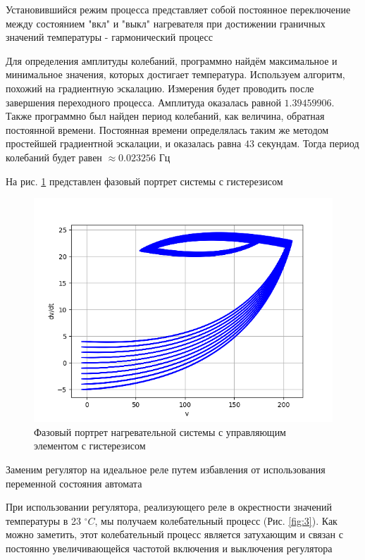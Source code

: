Установившийся режим процесса представляет собой постоянное переключение между состоянием "вкл" и "выкл" нагревателя
при достижении граничных значений температуры - гармонический процесс

Для определения амплитуды колебаний, программно найдём максимальное и минимальное значения,
которых достигает температура. Используем алгоритм, похожий на градиентную эскалацию. Измерения
будет проводить после завершения переходного процесса. Амплитуда оказалась равной $1.39459906$. Также
программно был найден период колебаний, как величина, обратная постоянной времени. Постоянная времени определялась
таким же методом простейшей градиентной эскалации, и оказалась равна $43$ секундам. Тогда период колебаний будет равен
$ \approx 0.023256$ Гц

На рис. \ref{fig:2} представлен фазовый портрет системы с гистерезисом

\begin{figure}[H]
	\centering
	\includegraphics[width=1\linewidth]{body/images/default-system-phase-portrait.png}
	\caption{Фазовый портрет нагревательной системы с управляющим элементом с гистерезисом}
	\label{fig:2}
\end{figure}

Заменим регулятор на идеальное реле путем избавления от использования переменной состояния автомата

При использовании регулятора, реализующего реле в окрестности значений температуры в 23 $ ^{\circ}C $,
мы получаем колебательный процесс (Рис. \ref{fig:3}). Как можно заметить, этот колебательный процесс является
затухающим и связан с постоянно увеличивающейся частотой включения и выключения регулятора

